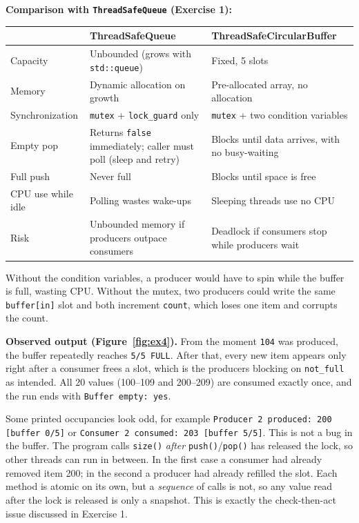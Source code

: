 \documentclass[11pt]{article}
\begin{document}
\textbf{Comparison with \texttt{ThreadSafeQueue} (Exercise 1):}
\begin{center}
\begin{tabular}{|p{3.3cm}|p{5.5cm}|p{5.5cm}|}
\hline
 & \textbf{ThreadSafeQueue} & \textbf{ThreadSafeCircularBuffer} \\ \hline
Capacity & Unbounded (grows with \texttt{std::queue}) & Fixed, 5 slots \\ \hline
Memory & Dynamic allocation on growth & Pre-allocated array, no allocation \\ \hline
Synchronization & \texttt{mutex} + \texttt{lock\_guard} only & \texttt{mutex} + two condition variables \\ \hline
Empty pop & Returns \texttt{false} immediately; caller must poll (sleep and retry) & Blocks until data arrives, with no busy-waiting \\ \hline
Full push & Never full & Blocks until space is free \\ \hline
CPU use while idle & Polling wastes wake-ups & Sleeping threads use no CPU \\ \hline
Risk & Unbounded memory if producers outpace consumers & Deadlock if consumers stop while producers wait \\ \hline
\end{tabular}
\end{center}
Without the condition variables, a producer would have to spin while the
buffer is full, wasting CPU. Without the mutex, two producers could write the
same \texttt{buffer[in]} slot and both increment \texttt{count}, which loses
one item and corrupts the count.

\textbf{Observed output (Figure~\ref{fig:ex4}).} From the moment
\texttt{104} was produced, the buffer repeatedly reaches \texttt{5/5 FULL}.
After that, every new item appears only right after a consumer frees a slot,
which is the producers blocking on \texttt{not\_full} as intended. All 20 values
(100--109 and 200--209) are consumed exactly once, and the run ends with
\texttt{Buffer empty: yes}.

Some printed occupancies look odd, for example \texttt{Producer 2 produced:
200 [buffer 0/5]} or \texttt{Consumer 2 consumed: 203 [buffer 5/5]}. This is
not a bug in the buffer. The program calls \texttt{size()} \emph{after}
\texttt{push()}/\texttt{pop()} has released the lock, so other threads can run in
between. In the first case a consumer had already removed item 200; in the
second a producer had already refilled the slot. Each method is atomic on its
own, but a \emph{sequence} of calls is not, so any value read after the lock is
released is only a snapshot. This is exactly the check-then-act issue
discussed in Exercise 1.
\end{document}
